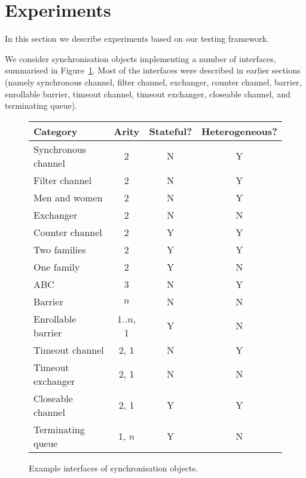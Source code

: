 \section{Experiments}
\label{sec:experiments}

In this section we describe experiments based on our testing framework. 


We consider synchronisation objects implementing a number of interfaces,
summarised in Figure~\ref{fig:examples}.  Most of the interfaces were
described in earlier sections (namely synchronous channel, filter channel,
exchanger, counter channel, barrier, enrollable barrier, timeout channel,
timeout exchanger, closeable channel, and terminating queue).


\begin{figure}
\begin{center}
\begin{tabular}{lccc}
Category            & Arity & Stateful? & Heterogeneous? \\ \hline
Synchronous channel & 2     & N         & Y \\
Filter channel      & 2     & N         & Y \\
Men and women        & 2     & N         & Y \\
Exchanger           & 2     & N         & N \\
Counter channel     & 2     & Y         & Y \\
Two families        & 2     & Y         & Y \\
One family          & 2     & Y         & N \\
ABC                 & 3     & N         & Y \\
Barrier             & $n$   & N         & N \\
Enrollable barrier  & $1\mathord{..} n$, 1 & Y & N \\
Timeout channel     & 2, 1  & N         & Y \\
Timeout exchanger   & 2, 1  & N         & N \\
Closeable channel   & 2, 1  & Y         & Y \\
Terminating queue   & 1, $n$ & Y        & N  
\end{tabular}
\end{center}
\caption{Example interfaces of synchronisation objects.  \label{fig:examples}}
\end{figure}


